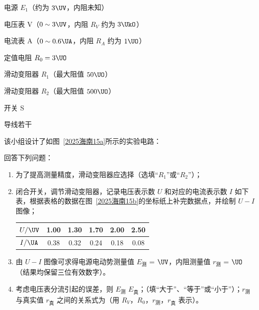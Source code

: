 \documentclass[\gkver]{gaokaozhenti}
\begin{document}
\begin{enumerate}
电源 $E_{1}$（约为 $3 \UV$，内阻未知）

电压表 V（$0 \sim 3 \UV$，内阻 $R_{V}$ 约为 $3 \UkO$）

电流表 A（$0 \sim 0.6 \UA$，内阻 $R_{A}$ 约为 $1 \UO$）

定值电阻 $R_{0} = 3 \UO$

滑动变阻器 $R_{1}$（最大阻值 $50 \UO$）

滑动变阻器 $R_{2}$（最大阻值 $500 \UO$）

开关 S

导线若干

该小组设计了如图~\ref{2025海南15a}所示的实验电路：

回答下列问题：

\begin{enumerate}
	\item
	为了提高测量精度，滑动变阻器应选择（选填“$R_{1}$”或“$R_{2}$”）；
	\item
	闭合开关，调节滑动变阻器，记录电压表示数 $U$ 和对应的电流表示数 $I$ 如下表，根据表格的数据在图~\ref{2025海南15b}的坐标纸上补完数据点，并绘制 $U-I$ 图像；

	\begin{center}
	\begin{tabular}{|c|c|c|c|c|c|}
	\hline
	$U/\UV$ & 1.00 & 1.30 & 1.70 & 2.00 & 2.50 \\
	\hline
	$I/\UA$ & 0.38 & 0.32 & 0.24 & 0.18 & 0.08 \\
	\hline
	\end{tabular}
	\end{center}

	\item
	由 $U-I$ 图像可求得电源电动势测量值 $E_{\text{测}}$ =  $\UV$，内阻测量值 $r_{\text{测}}$ =  $\UO$（结果均保留三位有效数字）。
	\item
	考虑电压表分流引起的误差，则 $E_{\text{测}}$  $E_{\text{真}}$；（填“大于”、“等于”或“小于”）；$r_{\text{测}}$ 与真实值 $r_{\text{真}}$ 之间的关系式为（用 $R_{V}$，$R_{0}$，$r_{\text{测}}$，$r_{\text{真}}$ 表示）。
\end{enumerate}


\end{enumerate}
\end{document}
